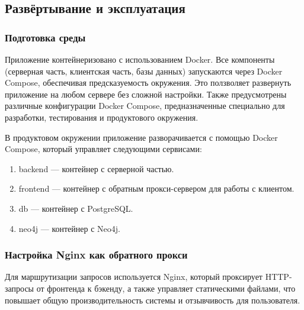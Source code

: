 


\subsection{Развёртывание и эксплуатация}

\subsubsection{Подготовка среды}

Приложение контейнеризовано с использованием Docker. Все компоненты (серверная часть, клиентская часть, базы данных) запускаются через Docker Compose, обеспечивая предсказуемость окружения. Это ползволяет развернуть приложение на любом сервере без сложной настройки. Также предусмотрены различные конфигурации Docker Compose, предназначенные специально для разработки, тестирования и продуктового окружения.

В продуктовом окружении приложение разворачивается с помощью Docker Compose, который управляет следующими сервисами:
\begin{enumerate}
    \item backend — контейнер с серверной частью.
    \item frontend — контейнер с обратным прокси-сервером для работы с клиентом.
    \item db — контейнер с PostgreSQL.
    \item neo4j — контейнер с Neo4j.
\end{enumerate}

\subsubsection{Настройка Nginx как обратного прокси}

Для маршрутизации запросов используется Nginx, который проксирует HTTP-запросы от фронтенда к бэкенду, а также управляет статическими файлами, что повышает общую производительность системы и отзывчивость для пользователя.

